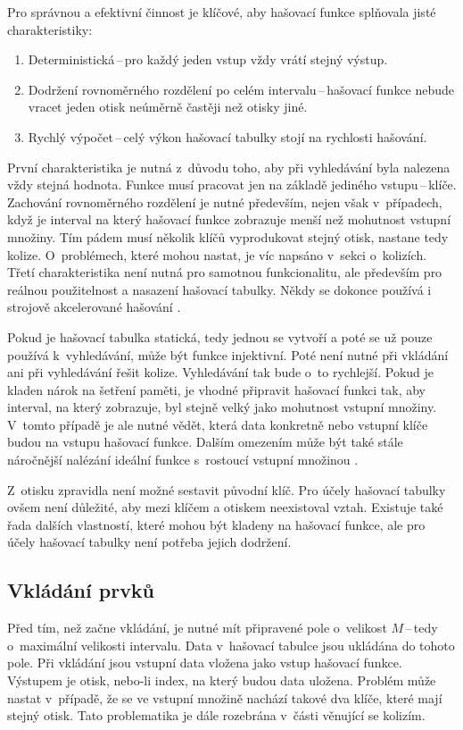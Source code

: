 Pro správnou a efektivní činnost je klíčové, aby hašovací funkce splňovala jisté charakteristiky:
\begin{enumerate}
    \item Deterministická\,--\,pro každý jeden vstup vždy vrátí stejný výstup.
    \item Dodržení rovnoměrného rozdělení po celém intervalu\,--\,hašovací funkce nebude vracet jeden otisk neúměrně častěji než otisky jiné.
    \item Rychlý výpočet\,--\,celý výkon hašovací tabulky stojí na rychlosti hašování.
\end{enumerate}
První charakteristika je nutná z~důvodu toho, aby při vyhledávání byla nalezena vždy stejná hodnota. Funkce musí pracovat jen na základě jediného vstupu\,--\,klíče. Zachování rovnoměrného rozdělení je nutné především, nejen však v~případech, když je interval na který hašovací funkce zobrazuje menší než mohutnost vstupní množiny. Tím pádem musí několik klíčů vyprodukovat stejný otisk, nastane tedy kolize. O~problémech, které mohou nastat, je víc napsáno v~sekci o~kolizích. Třetí charakteristika není nutná pro samotnou funkcionalitu, ale především pro reálnou použitelnost a nasazení hašovací tabulky. Někdy se dokonce používá i strojově akcelerované hašování \cite{HWhash}.

Pokud je hašovací tabulka statická, tedy jednou se vytvoří a poté se už pouze používá k~vyhledávání, může být funkce injektivní. Poté není nutné při vkládání ani při vyhledávání řešit kolize. Vyhledávání tak bude o~to rychlejší. Pokud je kladen nárok na šetření paměti, je vhodné připravit hašovací funkci tak, aby interval, na který zobrazuje, byl stejně velký jako mohutnost vstupní množiny. V~tomto případě je ale nutné vědět, která data konkretně nebo vstupní klíče budou na vstupu hašovací funkce. Dalším omezením může být také stále náročnější nalézání ideální funkce s~rostoucí vstupní množinou \cite{KnuthDonaldErvin1998Taoc}. 

Z~otisku zpravidla není možné sestavit původní klíč. Pro účely hašovací tabulky ovšem není důležité, aby mezi klíčem a otiskem neexistoval vztah. Existuje také řada dalších vlastností, které mohou být kladeny na hašovací funkce, ale pro účely hašovací tabulky není potřeba jejich dodržení.

\subsection*{Vkládání prvků}

Před tím, než začne vkládání, je nutné mít připravené pole o~velikost $M$\,--\,tedy o~maximální velikosti intervalu.
Data v~hašovací tabulce jsou ukládána do tohoto pole. Při vkládání jsou vstupní data vložena jako vstup hašovací funkce. Výstupem je otisk, nebo-li index, na který budou data uložena. Problém může nastat v~případě, že se ve vstupní množině nachází takové dva klíče, které mají stejný otisk. Tato problematika je dále rozebrána v~části věnující se kolizím.

